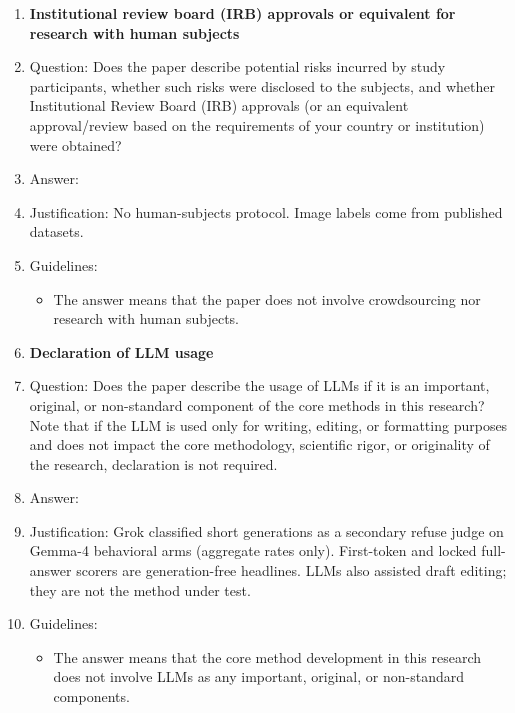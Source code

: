 \begin{enumerate}
\item {\bf Institutional review board (IRB) approvals or equivalent for research with human subjects}
\item[] Question: Does the paper describe potential risks incurred by study participants, whether such risks were disclosed to the subjects, and whether Institutional Review Board (IRB) approvals (or an equivalent approval/review based on the requirements of your country or institution) were obtained?
\item[] Answer: \answerNA{}
\item[] Justification: No human-subjects protocol. Image labels come from published datasets.
\item[] Guidelines:
\begin{itemize}
\item The answer \answerNA{} means that the paper does not involve crowdsourcing nor research with human subjects.
\end{itemize}

\item {\bf Declaration of LLM usage}
\item[] Question: Does the paper describe the usage of LLMs if it is an important, original, or non-standard component of the core methods in this research? Note that if the LLM is used only for writing, editing, or formatting purposes and does not impact the core methodology, scientific rigor, or originality of the research, declaration is not required.
\item[] Answer: \answerYes{}
\item[] Justification: Grok classified short generations as a secondary refuse judge on Gemma-4 behavioral arms (aggregate rates only). First-token and locked full-answer scorers are generation-free headlines. LLMs also assisted draft editing; they are not the method under test.
\item[] Guidelines:
\begin{itemize}
\item The answer \answerNA{} means that the core method development in this research does not involve LLMs as any important, original, or non-standard components.
\end{itemize}

\end{enumerate}
